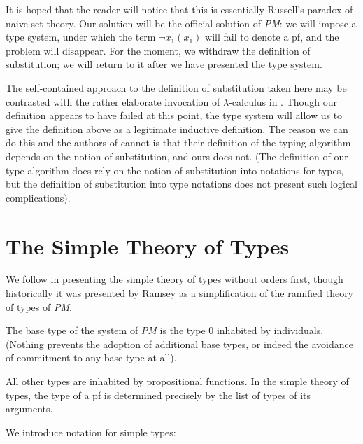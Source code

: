 \documentclass{article}
\begin{document}
It is hoped that the reader will notice that this is essentially
Russell's paradox of naive set theory.  Our solution will be the
official solution of {\em PM\/}: we will impose a type system, under
which the term $\neg x_1(x_1)$ will fail to denote a pf, and the
problem will disappear.  For the moment, we withdraw the definition of
substitution; we will return to it after we have presented the type
system.

The self-contained approach to the definition of substitution taken
here may be contrasted with the rather elaborate invocation of
$\lambda$-calculus in \cite{types40}.  Though our definition appears
to have failed at this point, the type system will allow us to give
the definition above as a legitimate inductive definition.  The reason
we can do this and the authors of \cite{types40} cannot is that their
definition of the typing algorithm depends on the notion of
substitution, and ours does not.  (The definition of our type
algorithm does rely on the notion of substitution into notations for
types, but the definition of substitution into type notations does not
present such logical complications).

\section{The Simple Theory of Types}

We follow \cite{types40} in presenting the simple theory of types
without orders first, though historically it was presented by Ramsey
as a simplification of the ramified theory of types of {\em PM\/}.

The base type of the system of {\em PM\/} is the type 0 inhabited by
individuals.  (Nothing prevents the adoption of additional base types,
or indeed the avoidance of commitment to any base type at all).

All other types are inhabited by propositional functions.  In the
simple theory of types, the type of a pf is determined precisely by
the list of types of its arguments.

We introduce notation for simple types:
\end{document}
